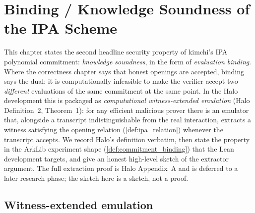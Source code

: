 \chapter{Binding / Knowledge Soundness of the IPA Scheme}

\providecommand{\oSpec}{\mathcal{O}_{\mathrm{spec}}}

This chapter states the second headline security property of kimchi's IPA
polynomial commitment: \emph{knowledge soundness}, in the form of
\emph{evaluation binding}. Where the correctness chapter says that honest
openings are accepted, binding says the dual: it is computationally infeasible to
make the verifier accept two \emph{different} evaluations of the same commitment
at the same point. In the Halo development this is packaged as \emph{computational
witness-extended emulation} (Halo Definition~2, Theorem~1): for any efficient
malicious prover there is an emulator that, alongside a transcript indistinguishable
from the real interaction, extracts a witness satisfying the opening relation
(\cref{def:ipa_relation}) whenever the transcript accepts. We record Halo's
definition verbatim, then state the property in the ArkLib experiment shape
(\cref{def:commitment_binding}) that the Lean development targets, and give an
honest high-level sketch of the extractor argument. The full extraction proof is
Halo Appendix~A and is deferred to a later research phase; the sketch here is a
sketch, not a proof.

\section{Witness-extended emulation}

